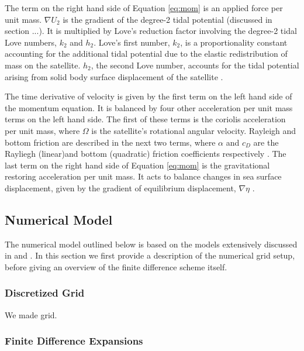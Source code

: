 The term on the right hand side of Equation \ref{eq:mom} is an applied force per unit mass. $\nabla U_2$ is the gradient of the degree-2 tidal potential (discussed in section ...). It is multiplied by Love's reduction factor involving the degree-2 tidal Love numbers, $k_2$ and $h_2$. Love's first number, $k_2$, is a proportionality constant accounting for the additional tidal potential due to the elastic redistribution of mass on the satellite. $h_2$, the second Love number, accounts for the tidal potential arising from solid body surface displacement of the satellite \citep{love1911some}.

The time derivative of velocity is given by the first term on the left hand side of the momentum equation. It is balanced by four other acceleration per unit mass terms on the left hand side. The first of these terms is the coriolis acceleration per unit mass, where $\Omega$ is the satellite's rotational angular velocity. Rayleigh and bottom friction are described in the next two terms, where $\alpha$ and $c_D$ are the Rayliegh (linear)and bottom (quadratic) friction coefficients respectively \citep{sears1995tidal,chen2013tidal}. The last term on the right hand side of Equation \ref{eq:mom} is the gravitational restoring acceleration per unit mass. It acts to balance changes in sea surface displacement, given by the gradient of equilibrium displacement, $\nabla \eta$ .

\subsection{Numerical Model \label{subsec:model}}

The numerical model outlined below is based on the models extensively discussed in \citet{zahel1973diurnalk,zahel1978influence} and \citet{sears1994tidal,sears1995tidal}. In this section we first provide a description of the numerical grid setup, before giving an overview of the finite difference scheme itself.

\subsubsection{Discretized Grid \label{subsec:grid}}

We made grid. 

\subsubsection{Finite Difference Expansions}

